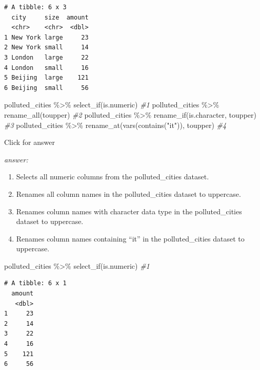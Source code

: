 \documentclass[
]{book}
\newenvironment{Shaded}{\begin{snugshade}}{\end{snugshade}}
\newcommand{\CommentTok}[1]{\textcolor[rgb]{0.56,0.35,0.01}{\textit{#1}}}
\newcommand{\FunctionTok}[1]{\textcolor[rgb]{0.00,0.00,0.00}{#1}}
\newcommand{\NormalTok}[1]{#1}
\newcommand{\SpecialCharTok}[1]{\textcolor[rgb]{0.00,0.00,0.00}{#1}}
\newcommand{\StringTok}[1]{\textcolor[rgb]{0.31,0.60,0.02}{#1}}
\providecommand{\tightlist}{%
  \setlength{\itemsep}{0pt}\setlength{\parskip}{0pt}}
\begin{document}
\begin{verbatim}
# A tibble: 6 x 3
  city     size  amount
  <chr>    <chr>  <dbl>
1 New York large     23
2 New York small     14
3 London   large     22
4 London   small     16
5 Beijing  large    121
6 Beijing  small     56
\end{verbatim}

\begin{Shaded}
\begin{Highlighting}[]
\NormalTok{polluted\_cities }\SpecialCharTok{\%\textgreater{}\%} \FunctionTok{select\_if}\NormalTok{(is.numeric) }\CommentTok{\#1}
\NormalTok{polluted\_cities }\SpecialCharTok{\%\textgreater{}\%} \FunctionTok{rename\_all}\NormalTok{(toupper) }\CommentTok{\#2}
\NormalTok{polluted\_cities }\SpecialCharTok{\%\textgreater{}\%} \FunctionTok{rename\_if}\NormalTok{(is.character, toupper) }\CommentTok{\#3}
\NormalTok{polluted\_cities }\SpecialCharTok{\%\textgreater{}\%} \FunctionTok{rename\_at}\NormalTok{(}\FunctionTok{vars}\NormalTok{(}\FunctionTok{contains}\NormalTok{(}\StringTok{"it"}\NormalTok{)), toupper) }\CommentTok{\#4}
\end{Highlighting}
\end{Shaded}

Click for answer

\emph{answer:}

\begin{enumerate}
\def\labelenumi{\arabic{enumi}.}
\tightlist
\item
  Selects all numeric columns from the polluted\_cities dataset.
\item
  Renames all column names in the polluted\_cities dataset to uppercase.
\item
  Renames column names with character data type in the polluted\_cities dataset to uppercase.
\item
  Renames column names containing ``it'' in the polluted\_cities dataset to uppercase.
\end{enumerate}

\begin{Shaded}
\begin{Highlighting}[]
\NormalTok{polluted\_cities }\SpecialCharTok{\%\textgreater{}\%} \FunctionTok{select\_if}\NormalTok{(is.numeric) }\CommentTok{\#1}
\end{Highlighting}
\end{Shaded}

\begin{verbatim}
# A tibble: 6 x 1
  amount
   <dbl>
1     23
2     14
3     22
4     16
5    121
6     56
\end{verbatim}
\end{document}
